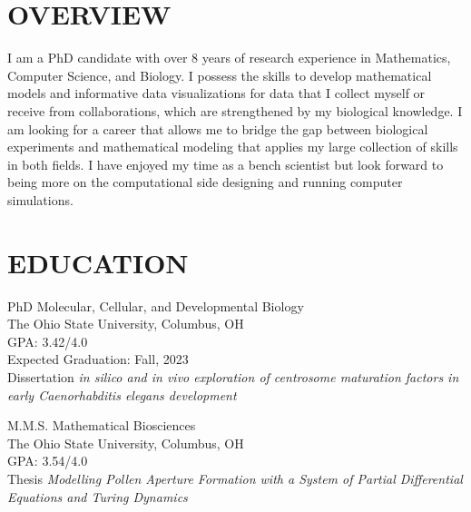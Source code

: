\documentclass[10pt]{res} %
\begin{document}

\address{{\bf Address} \\  630 Biological Sciences Building\\484 W 12th Ave  \\ Columbus, OH 43210}
\address{ shayne.plourde@outlook.com \\  \url{www.linkedin.com/in/shayne-plourde-a9aa38189} \\ \url{https://shayne-falco.github.io/}
         }

\begin{resume}

\section{OVERVIEW}
    I am a PhD candidate with over 8 years of research experience in Mathematics, Computer Science, and Biology. I possess the skills to develop mathematical models and informative data visualizations for data that I collect myself or receive from collaborations, which are strengthened by my biological knowledge. I am looking for a career that allows me to bridge the gap between biological experiments and mathematical modeling that applies my large collection of skills in both fields. I have enjoyed my time as a bench scientist but look forward to being more on the computational side designing and running computer simulations.
 
\section{EDUCATION}


        PhD Molecular, Cellular, and Developmental Biology\\
        The Ohio State University, Columbus, OH\\
        GPA: 3.42/4.0 \\
        Expected Graduation: Fall, 2023 \\
        Dissertation {\it in silico and in vivo exploration of centrosome maturation factors in early Caenorhabditis elegans development}
                
        M.M.S. Mathematical Biosciences\\
        The Ohio State University, Columbus, OH\\
        GPA: 3.54/4.0 \\
        Thesis {\it Modelling Pollen Aperture Formation with a System of Partial Differential Equations and Turing Dynamics}
                

\end{resume}
\end{document}
